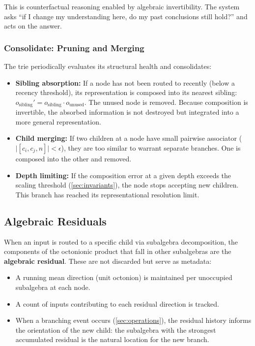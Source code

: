 \documentclass[11pt,a4paper]{article}
\theoremstyle{definition}
\theoremstyle{remark}
\begin{document}
This is counterfactual reasoning enabled by algebraic invertibility. The system asks ``if I change my understanding here, do my past conclusions still hold?'' and acts on the answer.

\subsubsection{Consolidate: Pruning and Merging}

The trie periodically evaluates its structural health and consolidates:

\begin{itemize}[nosep]
  \item \textbf{Sibling absorption:} If a node has not been routed to recently (below a recency threshold), its representation is composed into its nearest sibling: $o_{\text{sibling}}' = o_{\text{sibling}} \cdot o_{\text{unused}}$. The unused node is removed. Because composition is invertible, the absorbed information is not destroyed but integrated into a more general representation.

  \item \textbf{Child merging:} If two children at a node have small pairwise associator ($\lvert [c_i, c_j, n] \rvert < \epsilon$), they are too similar to warrant separate branches. One is composed into the other and removed.

  \item \textbf{Depth limiting:} If the composition error at a given depth exceeds the scaling threshold (\cref{sec:invariants}), the node stops accepting new children. This branch has reached its representational resolution limit.
\end{itemize}

\subsection{Algebraic Residuals}
\label{sec:residuals}

When an input is routed to a specific child via subalgebra decomposition, the components of the octonionic product that fall in other subalgebras are the \textbf{algebraic residual}. These are not discarded but serve as metadata:

\begin{itemize}[nosep]
  \item A running mean direction (unit octonion) is maintained per unoccupied subalgebra at each node.
  \item A count of inputs contributing to each residual direction is tracked.
  \item When a branching event occurs (\cref{sec:operations}), the residual history informs the orientation of the new child: the subalgebra with the strongest accumulated residual is the natural location for the new branch.
\end{itemize}
\end{document}
